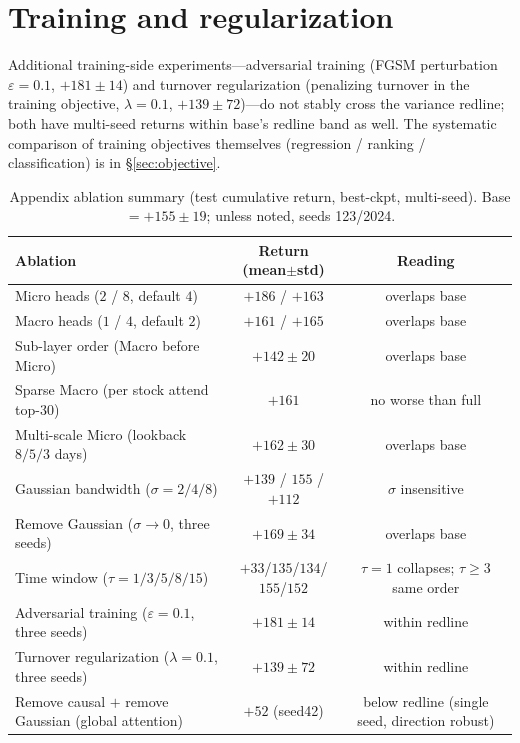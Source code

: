 \documentclass[a4paper,11pt]{article}
\begin{document}
\section{Training and regularization}\label{sec:abl-train}
Additional training-side experiments---adversarial training (FGSM perturbation
$\varepsilon{=}0.1$, $+181\pm14$) and turnover regularization (penalizing
turnover in the training objective, $\lambda{=}0.1$, $+139\pm72$)---do not
stably cross the variance redline; both have multi-seed returns within base's
redline band as well. The systematic comparison of training objectives
themselves (regression / ranking / classification) is in \S\ref{sec:objective}.

\begin{table}[H]
\centering
\caption{Appendix ablation summary (test cumulative return, best-ckpt,
multi-seed). Base $=+155\pm19$; unless noted, seeds 123/2024.}
\label{tab:appendix}
\begin{tabular}{lcc}
\toprule
Ablation & Return (mean$\pm$std) & Reading \\
\midrule
Micro heads ($2$ / $8$, default $4$)   & $+186$ / $+163$ & overlaps base \\
Macro heads ($1$ / $4$, default $2$)   & $+161$ / $+165$ & overlaps base \\
Sub-layer order (Macro before Micro)       & $+142\pm20$    & overlaps base \\
Sparse Macro (per stock attend top-$30$)  & $+161$         & no worse than full \\
Multi-scale Micro (lookback $8/5/3$ days)     & $+162\pm30$    & overlaps base \\
Gaussian bandwidth ($\sigma{=}2/4/8$)        & $+139$ / $155$ / $+112$ & $\sigma$ insensitive \\
Remove Gaussian ($\sigma\to0$, three seeds)      & $+169\pm34$    & overlaps base \\
Time window ($\tau{=}1/3/5/8/15$)       & $+33$/$135$/$134$/$155$/$152$ & $\tau{=}1$ collapses; $\tau\ge3$ same order \\
Adversarial training ($\varepsilon{=}0.1$, three seeds)& $+181\pm14$  & within redline \\
Turnover regularization ($\lambda{=}0.1$, three seeds) & $+139\pm72$    & within redline \\
Remove causal $+$ remove Gaussian (global attention)     & $+52$ (seed42) & below redline (single seed, direction robust) \\
\bottomrule
\end{tabular}
\end{table}
\end{document}
